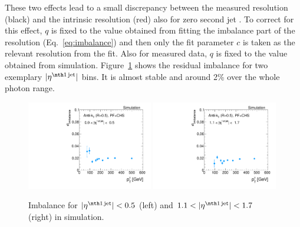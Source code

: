 These two effects lead to a small discrepancy between the measured resolution (black) and the intrinsic resolution (red) also for zero second jet \pt. 
To correct for this effect,  $q$ is fixed to the value obtained 
from fitting the imbalance part of the resolution (Eq.~\eqref{eq:imbalance}) and then only the fit parameter  $c$ is taken as the relevant resolution from the fit.
Also for measured data, $q$ is fixed to the value obtained from simulation. 
Figure~\ref{fig:ImbalanceOfPtgamma} shows the residual imbalance for two exemplary $|\etafirstjet|$ bins. 
It is almost stable and around 2\% over the whole photon \pt range.
\begin{figure}[!t]
  \centering
    \includegraphics[width=0.49\textwidth]{figures/resolution/methodology/Imbalance_for_1_eta_bin_PFCHS_mc_RMS99.pdf}
    \includegraphics[width=0.49\textwidth]{figures/resolution/methodology/Imbalance_for_3_eta_bin_PFCHS_mc_RMS99.pdf}
  \caption{Imbalance for $|\etafirstjet| < 0.5$ (left) and $1.1<|\etafirstjet| < 1.7$ (right) in simulation.}  
  \label{fig:ImbalanceOfPtgamma}
\end{figure}

